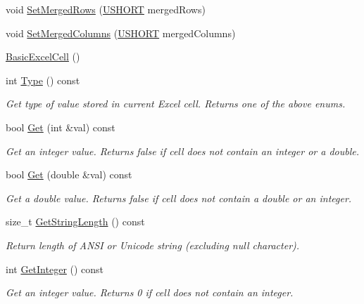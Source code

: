 \begin{DoxyCompactItemize}
void \hyperlink{class_y_excel_1_1_basic_excel_cell_ab0ec2595f0a47d7472dfb1b0f4887749}{Set\+Merged\+Rows} (\hyperlink{_basic_excel_8hpp_a5850d5316caf7f4cedd742fdf8cd7c02}{U\+S\+H\+O\+R\+T} merged\+Rows)
\item 
void \hyperlink{class_y_excel_1_1_basic_excel_cell_afff92187b5a0f7f12c90b4aefb5e7bb3}{Set\+Merged\+Columns} (\hyperlink{_basic_excel_8hpp_a5850d5316caf7f4cedd742fdf8cd7c02}{U\+S\+H\+O\+R\+T} merged\+Columns)
\item 
\hyperlink{class_y_excel_1_1_basic_excel_cell_a9f3231a6035eb58aad2a0e9ffaca3b29}{Basic\+Excel\+Cell} ()
\item 
int \hyperlink{class_y_excel_1_1_basic_excel_cell_aa9d27d98a1cb2635c7d2019212c18963}{Type} () const 
\begin{DoxyCompactList}\small\item\em Get type of value stored in current Excel cell. Returns one of the above enums. \end{DoxyCompactList}\item 
bool \hyperlink{class_y_excel_1_1_basic_excel_cell_a6c38d9da9a645ed8006de3b784d8a1f2}{Get} (int \&val) const 
\begin{DoxyCompactList}\small\item\em Get an integer value. Returns false if cell does not contain an integer or a double. \end{DoxyCompactList}\item 
bool \hyperlink{class_y_excel_1_1_basic_excel_cell_a74199e7dd46b22fd0b67ee42e652ee49}{Get} (double \&val) const 
\begin{DoxyCompactList}\small\item\em Get a double value. Returns false if cell does not contain a double or an integer. \end{DoxyCompactList}\item 
size\+\_\+t \hyperlink{class_y_excel_1_1_basic_excel_cell_a2ca927d2a0d52d5036c71c7cdfb07a3e}{Get\+String\+Length} () const 
\begin{DoxyCompactList}\small\item\em Return length of A\+N\+S\+I or Unicode string (excluding null character). \end{DoxyCompactList}\item 
int \hyperlink{class_y_excel_1_1_basic_excel_cell_af171d3ac7bd0873073832720d6857c9e}{Get\+Integer} () const 
\begin{DoxyCompactList}\small\item\em Get an integer value. Returns 0 if cell does not contain an integer. \end{DoxyCompactList}\item 

\end{DoxyCompactItemize}
